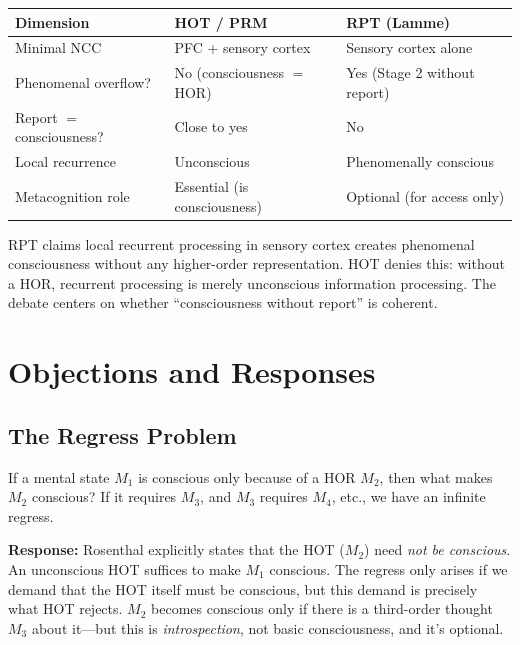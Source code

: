 \documentclass[11pt,a4paper]{report}
\begin{document}
\begin{compbox}
\renewcommand{\arraystretch}{1.4}
\begin{tabular}{>{\raggedright}p{3cm} >{\raggedright}p{5cm} >{\raggedright\arraybackslash}p{5cm}}
  \toprule
  \textbf{Dimension} & \textbf{HOT / PRM} & \textbf{RPT (Lamme)} \\
  \midrule
  Minimal NCC & PFC + sensory cortex & Sensory cortex alone \\
  Phenomenal overflow? & No (consciousness $=$ HOR) & Yes (Stage 2 without report) \\
  Report $=$ consciousness? & Close to yes & No \\
  Local recurrence & Unconscious & Phenomenally conscious \\
  Metacognition role & Essential (is consciousness) & Optional (for access only) \\
  \bottomrule
\end{tabular}
\end{compbox}

RPT claims local recurrent processing in sensory cortex creates phenomenal consciousness without any higher-order representation. HOT denies this: without a HOR, recurrent processing is merely unconscious information processing. The debate centers on whether ``consciousness without report'' is coherent.


\chapter{Objections and Responses}

\section{The Regress Problem}

\begin{objbox}
If a mental state $M_1$ is conscious only because of a HOR $M_2$, then what makes $M_2$ conscious? If it requires $M_3$, and $M_3$ requires $M_4$, etc., we have an infinite regress.
\end{objbox}

\textbf{Response:} Rosenthal explicitly states that the HOT ($M_2$) need \emph{not be conscious}. An unconscious HOT suffices to make $M_1$ conscious. The regress only arises if we demand that the HOT itself must be conscious, but this demand is precisely what HOT rejects. $M_2$ becomes conscious only if there is a third-order thought $M_3$ about it---but this is \emph{introspection}, not basic consciousness, and it's optional.
\end{document}
